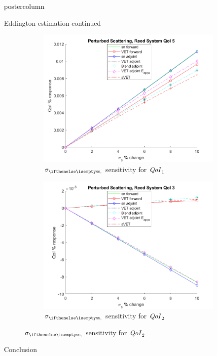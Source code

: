 \documentclass[xcolor={usenames,dvipsnames,svgnames,table}]{beamer}
\newcommand{\qoi}{{\it QoI}\xspace}
\begin{document}
\begin{frame}
\begin{columns}
\begin{column}{.33\textwidth}
\begin{beamercolorbox}[center,wd=\textwidth]{postercolumn}
\begin{minipage}[T]{0.95\textwidth}
{\begin{block}{Eddington estimation continued}
\begin{figure}[H]
\begin{subfigure}{.4\textwidth}
  \centering
  \includegraphics[width=.98\linewidth]{posterfigures/774sigsSens.png} 
  \caption{$\sigs$ sensitivity for $\qoi_1$}
  \label{fig:sfig5}
\end{subfigure}%
\begin{subfigure}{.4\textwidth}
  \centering
  \includegraphics[width=.98\linewidth]{posterfigures/772sigsSens.png}
  \caption{$\sigs$ sensitivity for $\qoi_2$}
  \label{fig:sfig4}
\end{subfigure}
\label{fig:fig}
\end{figure}			    
			    
			    
			    \end{block}
			    \vfill
			    \begin{block}{Conclusion}			    


\end{block}}
\end{minipage}
\end{beamercolorbox}
\end{column}
\end{columns}
\end{frame}
\end{document}

